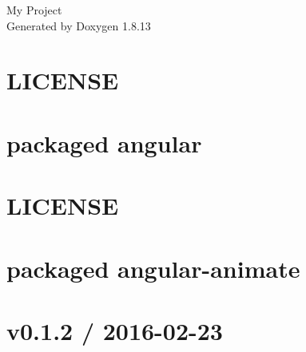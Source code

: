 \documentclass[twoside]{book}
\newcommand{\+}{\discretionary{\mbox{\scriptsize$\hookleftarrow$}}{}{}}
\newcommand{\clearemptydoublepage}{%
  \newpage{\pagestyle{empty}\cleardoublepage}%
}
\begin{document}
\hypersetup{pageanchor=false,
             bookmarksnumbered=true,
             pdfencoding=unicode
            }
\begin{titlepage}
\vspace*{7cm}
\begin{center}%
{\Large My Project }\\
\vspace*{1cm}
{\large Generated by Doxygen 1.8.13}\\
\end{center}
\end{titlepage}
\clearemptydoublepage
{}
\tableofcontents
\clearemptydoublepage
{}
\hypersetup{pageanchor=true}

\chapter{L\+I\+C\+E\+N\+SE}
\label{md_app_web_bower_components_angular__l_i_c_e_n_s_e}

\chapter{packaged angular}
\label{md_app_web_bower_components_angular__r_e_a_d_m_e}

\chapter{L\+I\+C\+E\+N\+SE}
\label{md_app_web_bower_components_angular-animate__l_i_c_e_n_s_e}

\chapter{packaged angular-\/animate}
\label{md_app_web_bower_components_angular-animate__r_e_a_d_m_e}

\chapter{v0.1.2 / 2016-\/02-\/23}
\label{md_app_web_bower_components_angular-appear__c_h_a_n_g_e_l_o_g}

\end{document}
